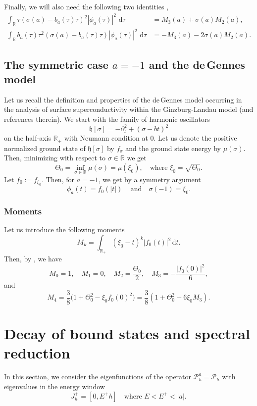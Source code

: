 \documentclass[10pt]{amsart}
\newcommand{\rd}{\,\mathrm{d}}
\newcommand{\cP}{\mathcal{P}}
\theoremstyle{plain}
\theoremstyle{definition}
\newcommand{\R}{\mathbb{R}}
\begin{document}
Finally, we will also need the following two identities \cite[Rem.\,2.3]{AHK},
\begin{equation}\label{aqddid}
\begin{split}
\int_{\mathbb R}\tau(\sigma(a)-b_a(\tau) \tau)^2|\phi_a(\tau)|^2\,\rd \tau&=M_3(a) +\sigma(a)M_2(a),\\
\int_{\mathbb R}b_a(\tau) \tau^2(\sigma(a)-b_a(\tau) \tau)|\phi_a(\tau)|^2\,\rd \tau&=-M_3(a)-2\sigma(a)M_2(a).
\end{split}
\end{equation}

\subsection{The symmetric case $a=-1$ and the de\,Gennes model}\label{sec.dG}
Let us recall the definition and properties of the de\,Gennes model occurring in the analysis of surface superconductivity within the Ginzburg-Landau model \cite[\S 3.2]{FH10} (and references therein). We start with the family of harmonic oscillators
\[
\mathfrak h[\sigma]=-\partial_t^2+(\sigma-bt)^2
\]
on the half-axis $\R_+$ with Neumann condition at $0$. Let us denote the positive normalized ground state of $\mathfrak h[\sigma]$ by $f_{\sigma}$ and the ground state energy by $\mu(\sigma)$. Then, minimizing with respect to $\sigma\in\R$ we get
\[
\Theta_0=\inf_{\sigma\in\R}\mu(\sigma)=\mu(\xi_0),\quad\text{where~}\xi_0=\sqrt{\Theta_0}.
\]
Let $f_0:=f_{\xi_0}$. Then, for $a=-1$, we get by a symmetry argument
\[
\phi_a(t)=f_0(|t|)\,
\quad \text{and}\quad \sigma(-1) = \xi_0.
\]

\subsubsection*{Moments}
Let us introduce the following moments
\[
M_k=\int_{\R_+}(\xi_0-t)^k|f_0(t)|^2\rd t.
\]
Then, by \cite{FH06}, we have
\begin{equation}\label{eq:moments3}
M_0=1,\quad M_1=0,\quad M_2=\frac{\Theta_0}2 ,\quad M_3=-\frac{|f_0(0)|^2}{6},
\end{equation}
and
\[
M_4= \frac{3}{8}\bigl(1+\Theta_0^2-\xi_0f_0(0)^2 \bigr)=\frac38(1+\Theta_0^2+6\xi_0M_3).
\]

\section{Decay of bound states and spectral reduction}\label{sec:red}

In this section, we consider the eigenfunctions of the operator $\cP^a_h=\cP_h$ with eigenvalues in the energy window
\begin{equation}
J^+_h=[0,E^+h]\quad\text{where~} E<E^+<|a|.
\end{equation}
\end{document}

